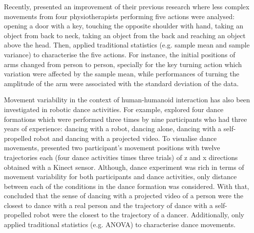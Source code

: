 Recently, \cite{guneysu2015} presented an improvement of their previous research
where less complex movements from four physiotherapists performing five actions 
were analysed: opening a door with a key, 
touching the opposite shoulder with hand, taking an object from back to neck, 
taking an object from the back and reaching an object above the head.
Then, \citealt[p. 252]{guneysu2015} applied traditional statistics 
(e.g. sample mean and sample variance) to characterise the five actions.
For instance, the  initial positions of arms changed from person to person, 
specially for the key turning action which variation were affected by the 
sample mean, while performances of turning the amplitude of the arm
were associated with the standard deviation of the data.


Movement variability in the context of human-humanoid interaction has also been
investigated in robotic dance activities.
For example, \cite{tsuchida2013} explored four dance formations which were performed 
three times by nine participants who had three years of experience: 
dancing with a robot, dancing alone, dancing with a self-propelled robot and dancing 
with a projected video.
To visualise dance movements, \cite{tsuchida2013} presented two participant's 
movement positions with twelve trajectories each (four dance activities times 
three trials) of z and x directions obtained with a Kinect sensor.
Although, dance experiment was rich in terms of movement variability
for both participants and dance activities, only distance between each of 
the conditions in the dance formation was considered. 
With that, \cite{tsuchida2013} concluded that the sense of dancing with a 
projected video of a person were the closest to dance with a real person and 
the trajectory of dance with a self-propelled robot were the closest 
to the trajectory of a dancer. Additionally, \cite{tsuchida2013} only applied 
traditional statistics (e.g. ANOVA) to characterise dance movements.







